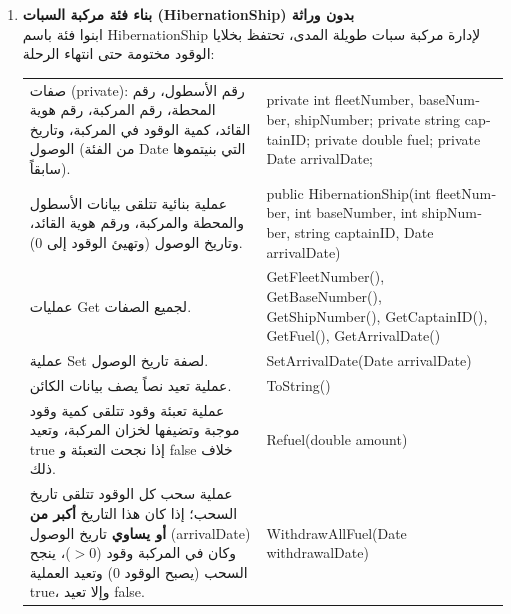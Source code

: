 \documentclass[14pt]{extarticle}
\begin{document}
\begin{enumerate}[label=\textbf{تمرين \arabic*:}, wide=0pt, leftmargin=*, itemsep=2.2em]
    \vspace{2em}
    \noindent \textbf{الفحص في \textenglish{Main}:} \\
    أنشئوا مركبتي استكشاف (إحداهما بالعملية البنائية الأولى والأخرى بالثانية)، وجرّبوا تعبئة الوقود واستهلاكه في حالات ناجحة وأخرى تتجاوز الاحتياطي الطارئ، واطبعوا بيانات المركبتين.

    \item \textbf{بناء فئة مركبة السبات (\textenglish{HibernationShip}) بدون وراثة} \\
    ابنوا فئة باسم \textenglish{HibernationShip} لإدارة مركبة سبات طويلة المدى، تحتفظ بخلايا الوقود مختومة حتى انتهاء الرحلة:

    {\centering
    \renewcommand{\arraystretch}{1.2}
    \small
    \begin{tabular}{|>{\raggedleft\arraybackslash}p{}|>{\raggedright\arraybackslash}p{}|}
    \hline
    \multicolumn{2}{|c|}{\textbf{الفئة: \textenglish{HibernationShip}}} \\
    \hline
    صفات (\textenglish{private}): رقم الأسطول، رقم المحطة، رقم المركبة، رقم هوية القائد، كمية الوقود في المركبة، وتاريخ الوصول (من الفئة \textenglish{Date} التي بنيتموها سابقاً). & \textenglish{private int fleetNumber, baseNumber, shipNumber;} \newline \textenglish{private string captainID;} \newline \textenglish{private double fuel;} \newline \textenglish{private Date arrivalDate;} \\
    \hline
    عملية بنائية تتلقى بيانات الأسطول والمحطة والمركبة، ورقم هوية القائد، وتاريخ الوصول (وتهيئ الوقود إلى \textenglish{0}). & \textenglish{public HibernationShip(int fleetNumber, int baseNumber, int shipNumber, string captainID, Date arrivalDate)} \\
    \hline
    عمليات \textenglish{Get} لجميع الصفات. & \textenglish{GetFleetNumber(), GetBaseNumber(), GetShipNumber(), GetCaptainID(), GetFuel(), GetArrivalDate()} \\
    \hline
    عملية \textenglish{Set} لصفة تاريخ الوصول. & \textenglish{SetArrivalDate(Date arrivalDate)} \\
    \hline
    عملية تعيد نصاً يصف بيانات الكائن. & \textenglish{ToString()} \\
    \hline
    عملية تعبئة وقود تتلقى كمية وقود موجبة وتضيفها لخزان المركبة، وتعيد \textenglish{true} إذا نجحت التعبئة و \textenglish{false} خلاف ذلك. & \textenglish{Refuel(double amount)} \\
    \hline
    عملية سحب كل الوقود تتلقى تاريخ السحب؛ إذا كان هذا التاريخ \textbf{أكبر من أو يساوي} تاريخ الوصول (\textenglish{arrivalDate}) وكان في المركبة وقود ($> 0$)، ينجح السحب (يصبح الوقود \textenglish{0}) وتعيد العملية \textenglish{true}، وإلا تعيد \textenglish{false}. & \textenglish{WithdrawAllFuel(Date withdrawalDate)} \\
    \hline
    \end{tabular}
    \par} %


\end{enumerate}
\end{document}
